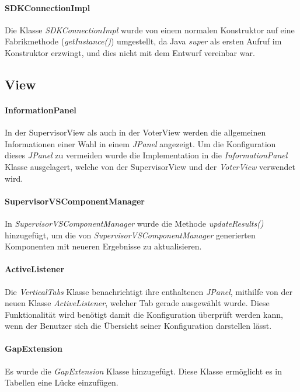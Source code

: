 \documentclass[parskip=full]{scrartcl}
\begin{document}
\paragraph{SDKConnectionImpl}
Die Klasse \textit{SDKConnectionImpl} wurde von einem normalen Konstruktor auf eine Fabrikmethode (\textit{getInstance()}) umgestellt, da Java \textit{super} als ersten Aufruf im Konstruktor erzwingt, und dies nicht mit dem Entwurf vereinbar war.

\subsection{View}

\paragraph{InformationPanel}
In der SupervisorView als auch in der VoterView werden die allgemeinen Informationen einer Wahl in einem \textit{JPanel} angezeigt. Um die Konfiguration dieses \textit{JPanel} zu vermeiden wurde die Implementation in die \textit{InformationPanel} Klasse ausgelagert, welche von der SupervisorView und der \textit{VoterView} verwendet wird. 

\paragraph{SupervisorVSComponentManager}
In \textit{SupervisorVSComponentManager} wurde die Methode \textit{updateResults()} hinzugefügt, um die von \textit{SupervisorVSComponentManager} generierten Komponenten mit neueren Ergebnisse zu aktualisieren.

\paragraph{ActiveListener}
Die \textit{VerticalTabs} Klasse benachrichtigt ihre enthaltenen \textit{JPanel}, mithilfe von der neuen Klasse \textit{ActiveListener}, welcher Tab gerade ausgewählt wurde. Diese Funktionalität wird benötigt damit die Konfiguration überprüft werden kann, wenn der Benutzer sich die Übersicht seiner Konfiguration darstellen lässt. 

\paragraph{GapExtension}
Es wurde die \textit{GapExtension} Klasse hinzugefügt. Diese Klasse ermöglicht es in Tabellen eine Lücke einzufügen.
\end{document}
